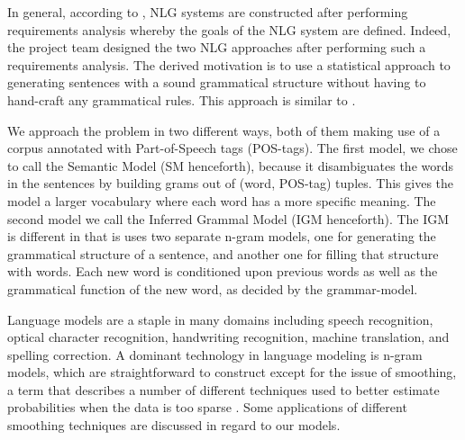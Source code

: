 \documentclass[ai15_group61_report.tex]{subfiles}
\begin{document}
In general, according to \cite{Reiter:2000:BNL:331955}, NLG systems are constructed after performing requirements analysis whereby the goals of the NLG system are defined. Indeed, the project team designed the two NLG approaches after performing such a requirements analysis. The derived motivation is to use a statistical approach to generating sentences with a sound grammatical structure without having to hand-craft any grammatical rules. This approach is similar to \cite{Ratnaparkhi00}.

We approach the problem in two different ways, both of them making use of a corpus annotated with Part-of-Speech tags (POS-tags). The first model, we chose to call the Semantic Model (SM henceforth), because it disambiguates the words in the sentences by building grams out of (word, POS-tag) tuples. This gives the model a larger vocabulary where each word has a more specific meaning. The second model we call the Inferred Grammal Model (IGM henceforth). The IGM is different in that is uses two separate n-gram models, one for generating the grammatical structure of a sentence, and another one for filling that structure with words. Each new word is conditioned upon previous words as well as the grammatical function of the new word, as decided by the grammar-model.

Language models are a staple in many domains including speech recognition, optical character recognition, handwriting recognition, machine translation, and spelling correction. A dominant technology in language modeling is n-gram models, which are straightforward to construct except for the issue of smoothing, a term that describes a number of different techniques used to better estimate probabilities when the data is too sparse \cite{chen-smoothing}. Some applications of different smoothing techniques are discussed in regard to our models.
\end{document}
